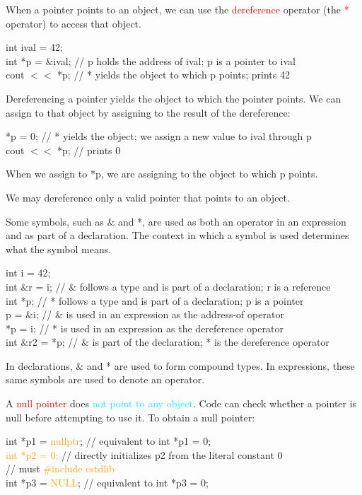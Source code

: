 \documentclass[12pt,a4paper]{article}
\begin{document}
When a pointer points to an object, we can use the \textcolor{red}{dereference} operator (the \textcolor{red}{*} operator) to access that object.

int ival = 42; \\
int *p = $\&$ival; // p holds the address of ival; p is a pointer to ival \\
cout $<<$ *p; // * yields the object to which p points; prints 42

Dereferencing a pointer yields the object to which the pointer points. We can assign to that object by assigning to the result of the dereference:

*p = 0; // * yields the object; we assign a new value to ival through p \\
cout $<<$ *p; // prints 0

When we assign to *p, we are assigning to the object to which p points.

We may dereference only a valid pointer that points to an object.

Some symbols, such as $\&$ and *, are used as both an operator in an expression and as part of a declaration. The context in which a symbol is used determines what the symbol means.

int i = 42; \\
int $\&$r = i; // $\&$ follows a type and is part of a declaration; r is a reference \\
int *p; // * follows a type and is part of a declaration; p is a pointer \\
p = $\&$i; // $\&$ is used in an expression as the address-of operator \\
*p = i; // * is used in an expression as the dereference operator \\
int $\&$r2 = *p; // $\&$ is part of the declaration; * is the dereference operator

In declarations, $\&$ and * are used to form compound types. In expressions, these same symbols are used to denote an operator. 


A \textcolor{red}{null pointer} does \textcolor{cyan}{not point to any object}. Code can check whether a pointer is null before attempting to use it.  To obtain a null pointer:

int *p1 = \textcolor{orange}{nullptr}; // equivalent to int *p1 = 0; \\
\textcolor{orange}{int *p2 = 0;} // directly initializes p2 from the literal constant 0 \\
// must \textcolor{orange}{$\#$include cstdlib} \\
int *p3 = \textcolor{orange}{NULL}; // equivalent to int *p3 = 0;
\end{document}

